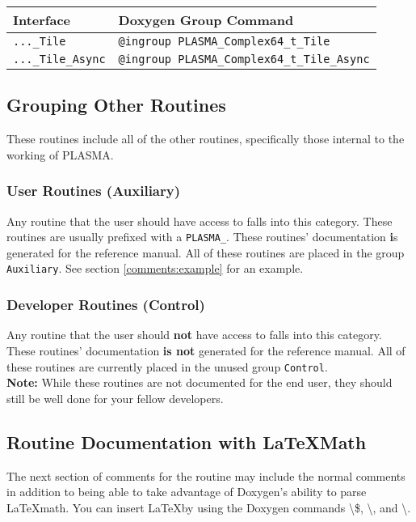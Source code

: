 \begin{tabular}{l|l}
\hline
Interface & Doxygen Group Command \\
\hline
{\tt ...\_Tile} & {\tt @ingroup PLASMA\_Complex64\_t\_Tile} \\
{\tt ...\_Tile\_Async} & {\tt @ingroup PLASMA\_Complex64\_t\_Tile\_Async} \\
\end{tabular}

\subsection{Grouping Other Routines}
These routines include all of the other routines, specifically those internal to the working of PLASMA.

\subsubsection{User Routines (Auxiliary)}
Any routine that the user should have access to falls into this category.  These routines are usually prefixed with a {\tt PLASMA\_}.  These routines' documentation {\textbf is} generated for the reference manual.  All of these routines are placed in the group {\tt Auxiliary}. See section \ref{comments:example} for an example.

\subsubsection{Developer Routines (Control)}
Any routine that the user should \textbf{not} have access to falls into this category.  These routines' documentation \textbf{is not} generated for the reference manual.  All of these routines are currently placed in the unused group {\tt Control}. \\
\textbf{Note:} While these routines are not documented for the end user, they should still be well done for your fellow developers.

\subsection{Routine Documentation with \LaTeX Math}
\label{comments:latex}
The next section of comments for the routine may include the normal comments in addition to being able to take advantage of Doxygen's ability to parse \LaTeX math.  You can insert \LaTeX by using the Doxygen commands \textbackslash\$, \textbackslash\lbrack, and \textbackslash\rbrack.


